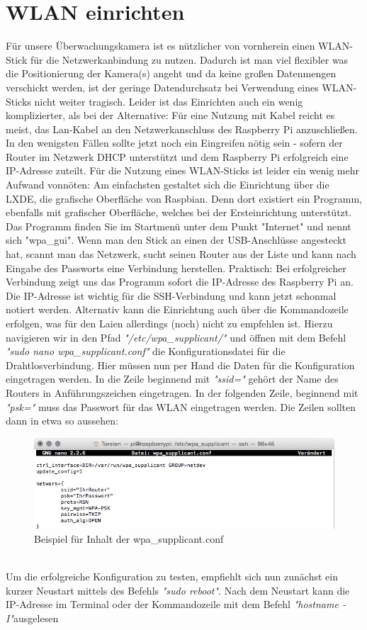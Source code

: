 \documentclass[12pt,a4paper]{scrreprt}
\begin{document}
\section{WLAN einrichten}
Für unsere Überwachungskamera ist es nützlicher von vornherein einen WLAN-Stick für die Netzwerkanbindung zu nutzen. Dadurch ist man viel flexibler was die Positionierung der Kamera(s) angeht und da keine großen Datenmengen verschickt werden, ist der geringe Datendurchsatz bei Verwendung eines WLAN-Sticks nicht weiter tragisch. Leider ist das Einrichten auch ein wenig komplizierter, als bei der Alternative: Für eine Nutzung mit Kabel reicht es meist, das Lan-Kabel an den Netzwerkanschluss des Raspberry Pi anzuschließen. In den wenigsten Fällen sollte jetzt noch ein Eingreifen nötig sein - sofern der Router im Netzwerk DHCP unterstützt und dem Raspberry Pi erfolgreich eine IP-Adresse zuteilt. Für die Nutzung eines WLAN-Sticks ist leider ein wenig mehr Aufwand vonnöten: Am einfachsten gestaltet sich die Einrichtung über die LXDE, die grafische Oberfläche von Raspbian. Denn dort existiert ein Programm, ebenfalls mit grafischer Oberfläche, welches bei der Ersteinrichtung unterstützt. Das Programm finden Sie im Startmenü unter dem Punkt "Internet" und nennt sich "wpa\_gui". Wenn man den Stick an einen der USB-Anschlüsse angesteckt hat, scannt man das Netzwerk, sucht seinen Router aus der Liste und kann nach Eingabe des Passworts eine Verbindung herstellen. Praktisch: Bei erfolgreicher Verbindung zeigt uns das Programm sofort die IP-Adresse des Raspberry Pi an. Die IP-Adresse ist wichtig für die SSH-Verbindung und kann jetzt schonmal notiert werden. Alternativ kann die Einrichtung auch über die Kommandozeile erfolgen, was für den Laien allerdings (noch) nicht zu empfehlen ist. Hierzu navigieren wir in den Pfad \textit{"/etc/wpa\_supplicant/"} und öffnen mit dem Befehl \textit{"sudo nano wpa\_supplicant.conf"} die Konfigurationsdatei für die Drahtlosverbindung. Hier müssen nun per Hand die Daten für die Konfiguration eingetragen werden. In die Zeile beginnend mit \textit{"ssid="} gehört der Name des Routers in Anführungszeichen eingetragen. In der folgenden Zeile, beginnend mit \textit{"psk="} muss das Passwort für das WLAN eingetragen werden. Die Zeilen sollten dann in etwa so aussehen:\\ \begin{figure}[h] \includegraphics[width=15.8cm]{wpa} \caption{Beispiel für Inhalt der wpa\_supplicant.conf} \end{figure} \\ Um die erfolgreiche Konfiguration zu testen, empfiehlt sich nun zunächst ein kurzer Neustart mittels des Befehls \textit{"sudo reboot"}. Nach dem Neustart kann die IP-Adresse im Terminal oder der Kommandozeile mit dem Befehl \textit{"hostname -I"}ausgelesen 
\end{document}
